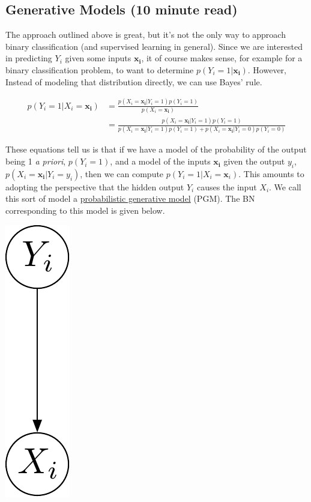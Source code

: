 \documentclass[assignment03_Solutions]{subfiles}
\begin{document}
\subsection{Generative Models (10 minute read)}
The approach outlined above is great, but it's not the only way to approach binary classification (and supervised learning in general).  Since we are interested in predicting $Y_i$ given some inputs $\mathbf{x_i}$, it of course makes sense, for example for a binary classification problem, to want to determine $p(Y_i = 1 | \mathbf{x_i})$.  However, Instead of modeling that distribution directly, we can use Bayes' rule.

\begin{align}
p(Y_i  = 1 | X_i = \mathbf{x_i}) &= \frac{p(X_i = \mathbf{x_i} | Y_i = 1) p(Y_i = 1)}{p(X_i = \mathbf{x_i})} \label{eq:pgm} \\
&= \frac{p(X_i = \mathbf{x_i} | Y_i = 1) p(Y_i = 1)}{p(X_i =  \mathbf{x_i} | Y_i = 1) p(Y_i = 1) + p(X_i = \mathbf{x_i} | Y_i = 0) p(Y_i = 0)} \nonumber
\end{align}

These equations tell us is that if we have a model of the probability of the output being 1 \emph{a priori}, $p(Y_i = 1)$, and a model of the inputs $\mathbf{x_i}$ given the output $y_i$, $p(X_i = \mathbf{x_i} | Y_i = y_i)$, then we can compute $p(Y_i = 1 | X_i = \mathbf{x}_i)$.  This amounts to adopting the perspective that the hidden output $Y_i$ causes the input $X_i$.  We call this sort of model a \href{https://en.wikipedia.org/wiki/Generative_model}{probabilistic generative model} (PGM).  The BN corresponding to this model is given below.

\begin{center}
\includegraphics[width=0.05\linewidth]{figures/pgm}
\end{center}
\end{document}
